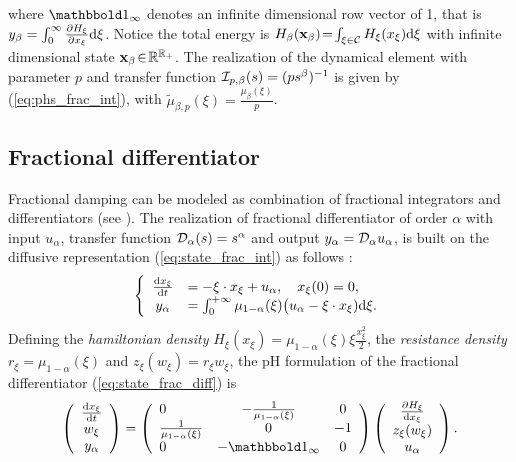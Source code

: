 \documentclass[10pt,a4paper]{article}
\begin{document}
where $\ones_\infty$ denotes an infinite dimensional row vector of 1, that is $y_\beta = \int_0^{\infty }\frac{\partial H_\xi}{\partial x_\xi} \mathrm{d} \xi$.
%
Notice the total energy is $H_\beta(\mathbf{x}_\beta)\!=\!\int_{\xi\in\mathcal{C}} H_\xi(x_\xi)  \mathrm{d} \xi$ with infinite dimensional state $\bf x_\beta\!\in\!\mathbb{R}^{\mathbb{R_+}}$. 
The realization of the dynamical element with parameter $p$ and transfer function ${\mathcal{I}}_{p,\beta}(s) = (p s^\beta)^{-1}$ is given by (\ref{eq:phs_frac_int}), with $\tilde \mu_{\beta,p}(\xi)= \frac{ \mu_\beta(\xi)}{p}$.
%
%
%
%
%
%
%
%
%
%
%
%
%
%
%
%
%
%
%
%
%
%
\subsection{Fractional differentiator}
\label{sec:frac_diff}
Fractional damping can be modeled as combination of fractional integrators and differentiators (see \cite{koeller1984applications,helie2006diffusive,sabatier2007advances,le2012diffusive}).
%
The realization of fractional differentiator of order $\alpha$ with input $u_\alpha$, transfer function ${\mathcal{D}}_\alpha(s)=s^{\alpha}$ and output $y_\alpha={\mathcal{D}}_\alpha u_\alpha$, is built on the diffusive representation (\ref{eq:state_frac_int}) as follows \cite{helie2006diffusive, le2012diffusive}:
%
\begin{equation}
\label{eq:state_frac_diff}
\left\{ \begin{array}{cl}
\frac{\mathrm{d} x_\xi}{ \mathrm{d} t} &=  -\xi\cdot x_\xi  + u_\alpha,\quad x_\xi(0)=0,\\
y_\alpha&= \int_0^{+\infty} \mu_{1-\alpha}(\xi)\big(u_\alpha-\xi\cdot x_\xi)\mathrm{d} \xi .
\end{array} \right.
\end{equation}
%
Defining the \emph{hamiltonian density }$H_\xi(x_\xi) = \mu_{1-\alpha}(\xi) \xi \frac{x_\xi^2}{2} $, the \emph{resistance density }$r_\xi = \mu_{1-\alpha}(\xi)$ and $z_\xi( w_\xi)=r_\xi w_\xi$, the pH formulation of the fractional differentiator (\ref{eq:state_frac_diff}) is 
\begin{equation}
\label{eq:phs_frac_diff}
\left(\begin{array}{c}
\frac{\d x_\xi}{ \d t} \\
w_\xi \\
y_\alpha
\end{array}\right)
=
\left(\begin{array}{lcc}
0 & - \frac{1}{\mu_{1-\alpha}(\xi)} & 0\\
 \frac{1}{\mu_{1-\alpha}(\xi)} & 0 & -1\\
0 & -\ones_\infty & 0
\end{array}\right)
\left(\begin{array}{c}
\frac{\partial H_\xi}{\d x_\xi}\\
z_\xi( w_\xi) \\
u_\alpha
\end{array}\right).
\end{equation}
% 
%
%
%
%
%
%
%
%
%
%
%
%
%
%
%
%
%
%
%
%
%
%
\end{document}
